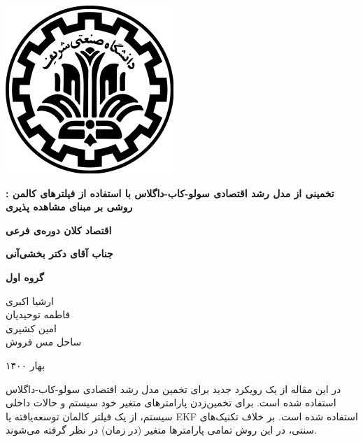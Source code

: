 \documentclass[11pt, fleqn]{article}
\begin{document}
\renewcommand\refname{}





\begin{center}

			\vspace{-1cm}
		   \includegraphics[scale=0.35]{Sharif}%
		   \vspace{2cm}

\textbf{
\Huge{
تخمینی از مدل رشد اقتصادی سولو-کاب-داگلاس
با استفاده از فیلتر‌های کالمن
: روشی بر مبنای مشاهده پذیری
}}
\vspace{2cm}

\textbf{
\huge{
اقتصاد کلان دوره‌ی فرعی
}}
\vspace{1mm}

\textbf{
\huge{
جناب آقای دکتر بخشی‌آنی
}}

\vspace{10mm}

\textbf{
\Large{
گروه اول
\\}}
\Large{

ارشیا اکبری
\\
فاطمه توحیدیان
\\
امین کشیری
\\
ساحل مس فروش
}

\vspace{3cm}

\large{
بهار ۱۴۰۰
}
\end{center}


\newpage
{}






\newhline

در این مقاله از یک رویکرد جدید برای تخمین مدل رشد اقتصادی سولو-کاب-داگلاس استفاده شده است. برای تخمین‌زدن پارامتر‌های متغیر خود سیستم و حالات داخلی سیستم، از یک فیلتر کالمان توسعه‌یافته 
 یا
 EKF
 استفاده شده است. بر خلاف تکنیک‌های سنتی، در این روش تمامی پارامتر‌ها متغیر (در زمان) در نظر گرفته می‌شوند. 
  
\end{document}
